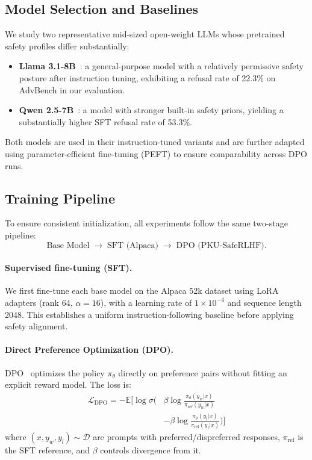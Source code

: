 \documentclass[a4paper, twocolumn, 9pt]{article}
\begin{document}
\subsection{Model Selection and Baselines}

We study two representative mid-sized open-weight LLMs whose pretrained safety
profiles differ substantially:

\begin{itemize}
\item \textbf{Llama 3.1-8B}~\cite{llama3}: a general-purpose model with a relatively
      permissive safety posture after instruction tuning, exhibiting a refusal rate
      of 22.3\% on AdvBench in our evaluation.
\item \textbf{Qwen 2.5-7B}~\cite{qwen2.5}: a model with stronger built-in safety priors,
      yielding a substantially higher SFT refusal rate of 53.3\%.
\end{itemize}

Both models are used in their instruction-tuned variants and are further adapted
using parameter-efficient fine-tuning (PEFT) to ensure comparability across DPO runs.

\subsection{Training Pipeline}

To ensure consistent initialization, all experiments follow the same two-stage
pipeline:
\[
\text{Base Model} \;\rightarrow\; \text{SFT (Alpaca)} \;\rightarrow\; \text{DPO (PKU-SafeRLHF)}.
\]

\paragraph{Supervised fine-tuning (SFT).}
We first fine-tune each base model on the Alpaca 52k dataset using LoRA adapters
(rank 64, $\alpha=16$), with a learning rate of $1\times 10^{-4}$ and sequence length 2048.
This establishes a uniform instruction-following baseline before applying safety
alignment.

\paragraph{Direct Preference Optimization (DPO).}
DPO~\cite{dpo} optimizes the policy $\pi_\theta$ directly on preference pairs without
fitting an explicit reward model. The loss is:
\begin{align}
\mathcal{L}_{\text{DPO}} = -\mathbb{E}\Big[ \log \sigma \big(
& \beta \log \tfrac{\pi_\theta(y_w|x)}{\pi_{\text{ref}}(y_w|x)} \nonumber \\[-2pt]
& - \beta \log \tfrac{\pi_\theta(y_l|x)}{\pi_{\text{ref}}(y_l|x)} \big) \Big]
\label{eq:dpo}
\end{align}
where $(x, y_w, y_l) \sim \mathcal{D}$ are prompts with preferred/dispreferred responses, $\pi_{\text{ref}}$ is the SFT reference, and $\beta$ controls divergence from it.
\end{document}
